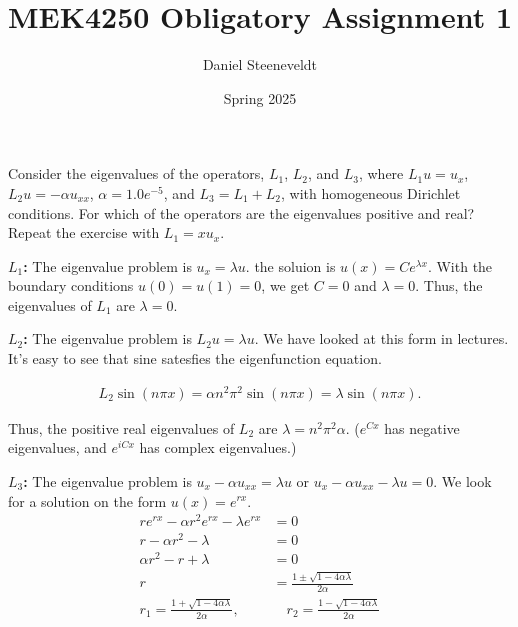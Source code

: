 \documentclass[a4paper,12pt]{article}
\title{
    MEK4250 Obligatory Assignment 1
}
\author{Daniel Steeneveldt}
\date{Spring 2025}
\theoremstyle{exerciseStyle}
\theoremstyle{solutionStyle}
\begin{document}
\maketitle




\begin{exercise}{5.6}
    Consider the eigenvalues of the operators, $L_1$, $L_2$, and $L_3$, where $L_1 u = u_x$, $L_2 u = -\alpha u_{xx}$, $\alpha = 1.0 e^{-5}$, and $L_3 = L_1 + L_2$, with homogeneous Dirichlet conditions.
    For which of the operators are the eigenvalues positive and real?
    Repeat the exercise with $L_1 = x u_x$.
\end{exercise}

\begin{solution}{5.6}

    \medskip\noindent\textbf{$L_1$:}
    The eigenvalue problem is $u_x = \lambda u$.
    the soluion is $u(x) = C e^{\lambda x}$.
    With the boundary conditions $u(0) = u(1) = 0$, we get $C = 0$ and $\lambda = 0$.
    Thus, the eigenvalues of $L_1$ are $\lambda = 0$.


    \medskip\noindent\textbf{$L_2$:}
    The eigenvalue problem is $L_2 u = \lambda u$. We have looked at this form in lectures.
    It's easy to see that sine satesfies the eigenfunction equation.

    \begin{align*}
        L_2 \sin(n \pi x) = \alpha n^2 \pi^2  \sin(n \pi x) = \lambda \sin(n \pi x).
    \end{align*}%

    Thus, the positive real eigenvalues of $L_2$ are $\lambda = n^2 \pi^2 \alpha$. ($e^{C x}$ has
    negative eigenvalues, and $e^{i C x}$ has complex eigenvalues.)

    \medskip\noindent\textbf{$L_3$:}
    The eigenvalue problem is
    $u_x - \alpha u_{xx} = \lambda u$ or $u_x - \alpha u_{xx} - \lambda u = 0$.
    We look for a solution on the form $u(x) = e^{r x}$.
    \begin{align*}
        r e^{r x} - \alpha r^2 e^{r x} - \lambda e^{r x}        & = 0                                                  \\
        r - \alpha r^2 - \lambda                                & = 0                                                  \\
        \alpha r^2 - r + \lambda                                & = 0                                                  \\
        r                                                       & = \frac{1 \pm \sqrt{1 - 4 \alpha \lambda}}{2 \alpha} \\
        r_1 = \frac{1 + \sqrt{1 - 4 \alpha \lambda}}{2 \alpha}, &
        \quad r_2 = \frac{1 - \sqrt{1 - 4 \alpha \lambda}}{2 \alpha}                                                   \\
    \end{align*}%


\end{solution}
\end{document}
